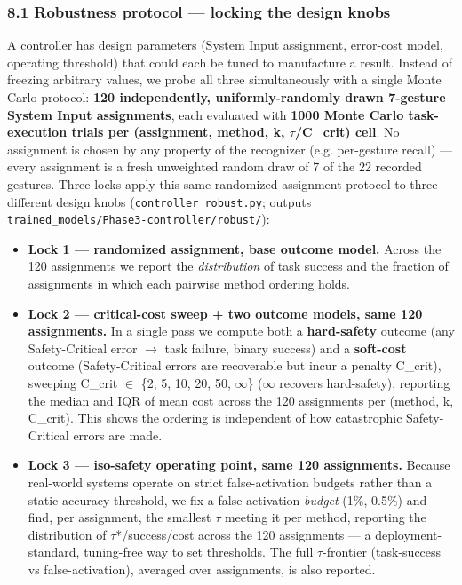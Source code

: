 \subsubsection{8.1 Robustness protocol --- locking the design knobs}
A controller has design parameters (System Input assignment, error-cost model, operating threshold) that could each be tuned to manufacture a result. Instead of freezing arbitrary values, we probe all three simultaneously with a single Monte Carlo protocol: \textbf{120 independently, uniformly-randomly drawn 7-gesture System Input assignments}, each evaluated with \textbf{1000 Monte Carlo task-execution trials per (assignment, method, k, $\tau$/C\_crit) cell}. No assignment is chosen by any property of the recognizer (e.g. per-gesture recall) --- every assignment is a fresh unweighted random draw of 7 of the 22 recorded gestures. Three locks apply this same randomized-assignment protocol to three different design knobs (\texttt{controller\_robust.py}; outputs \texttt{trained\_models/Phase3-controller/robust/}):

\begin{itemize}
  \item \textbf{Lock 1 --- randomized assignment, base outcome model.} Across the 120 assignments we report the \textit{distribution} of task success and the fraction of assignments in which each pairwise method ordering holds.
  \item \textbf{Lock 2 --- critical-cost sweep + two outcome models, same 120 assignments.} In a single pass we compute both a \textbf{hard-safety} outcome (any Safety-Critical error $\rightarrow$ task failure, binary success) and a \textbf{soft-cost} outcome (Safety-Critical errors are recoverable but incur a penalty C\_crit), sweeping C\_crit $\in$ \{2, 5, 10, 20, 50, $\infty$\} ($\infty$ recovers hard-safety), reporting the median and IQR of mean cost across the 120 assignments per (method, k, C\_crit). This shows the ordering is independent of how catastrophic Safety-Critical errors are made.
  \item \textbf{Lock 3 --- iso-safety operating point, same 120 assignments.} Because real-world systems operate on strict false-activation budgets rather than a static accuracy threshold, we fix a false-activation \textit{budget} (1\%, 0.5\%) and find, per assignment, the smallest $\tau$ meeting it per method, reporting the distribution of $\tau$*/success/cost across the 120 assignments --- a deployment-standard, tuning-free way to set thresholds. The full $\tau$-frontier (task-success vs false-activation), averaged over assignments, is also reported.
\end{itemize}

